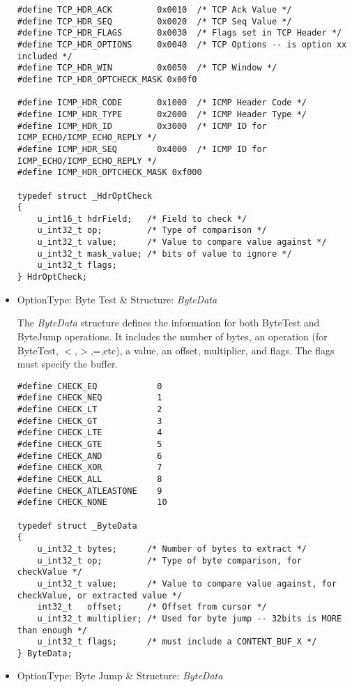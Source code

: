\documentclass[english]{report}
\begin{document}
\begin{itemize}
\begin{verbatim}
#define TCP_HDR_ACK         0x0010  /* TCP Ack Value */
#define TCP_HDR_SEQ         0x0020  /* TCP Seq Value */
#define TCP_HDR_FLAGS       0x0030  /* Flags set in TCP Header */
#define TCP_HDR_OPTIONS     0x0040  /* TCP Options -- is option xx included */
#define TCP_HDR_WIN         0x0050  /* TCP Window */
#define TCP_HDR_OPTCHECK_MASK 0x00f0

#define ICMP_HDR_CODE       0x1000  /* ICMP Header Code */
#define ICMP_HDR_TYPE       0x2000  /* ICMP Header Type */
#define ICMP_HDR_ID         0x3000  /* ICMP ID for ICMP_ECHO/ICMP_ECHO_REPLY */
#define ICMP_HDR_SEQ        0x4000  /* ICMP ID for ICMP_ECHO/ICMP_ECHO_REPLY */
#define ICMP_HDR_OPTCHECK_MASK 0xf000

typedef struct _HdrOptCheck
{
    u_int16_t hdrField;   /* Field to check */
    u_int32_t op;         /* Type of comparison */
    u_int32_t value;      /* Value to compare value against */
    u_int32_t mask_value; /* bits of value to ignore */
    u_int32_t flags;
} HdrOptCheck;
\end{verbatim}

\item {OptionType: Byte Test \& Structure: {\em ByteData}}

The {\em ByteData} structure defines the information for both ByteTest and
ByteJump operations.  It includes the number of bytes, an operation (for
ByteTest, $<$,$>$,=,etc), a value, an offset, multiplier, and flags.  The flags
must specify the buffer.

\begin{verbatim}
#define CHECK_EQ            0
#define CHECK_NEQ           1
#define CHECK_LT            2
#define CHECK_GT            3
#define CHECK_LTE           4
#define CHECK_GTE           5
#define CHECK_AND           6
#define CHECK_XOR           7
#define CHECK_ALL           8
#define CHECK_ATLEASTONE    9
#define CHECK_NONE          10

typedef struct _ByteData
{
    u_int32_t bytes;      /* Number of bytes to extract */
    u_int32_t op;         /* Type of byte comparison, for checkValue */
    u_int32_t value;      /* Value to compare value against, for checkValue, or extracted value */
    int32_t   offset;     /* Offset from cursor */
    u_int32_t multiplier; /* Used for byte jump -- 32bits is MORE than enough */
    u_int32_t flags;      /* must include a CONTENT_BUF_X */
} ByteData;
\end{verbatim}

\item {OptionType: Byte Jump \& Structure: {\em ByteData}}


\end{itemize}
\end{document}
